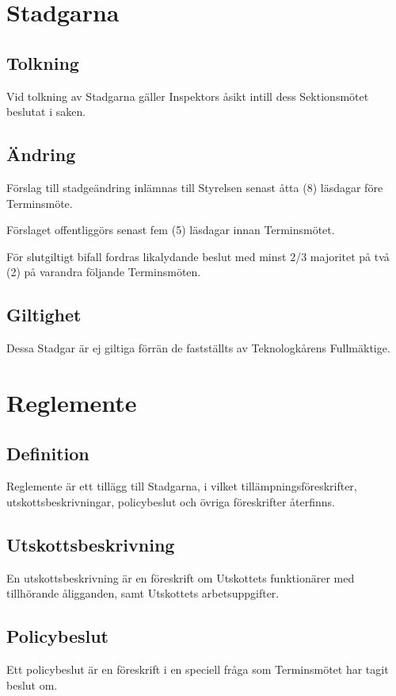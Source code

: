 \documentclass[10pt]{article}
\begin{document}
\section{Stadgarna}
\subsection{Tolkning}
Vid tolkning av Stadgarna gäller Inspektors åsikt intill dess Sektionsmötet
beslutat i saken.

\subsection{Ändring}
Förslag till stadgeändring inlämnas till Styrelsen senast åtta (8) läsdagar
före Terminsmöte.

Förslaget offentliggörs senast fem (5) läsdagar innan Terminsmötet.

För slutgiltigt bifall fordras likalydande beslut med minst 2/3 majoritet på
två (2) på varandra följande Terminsmöten.

\subsection{Giltighet}
Dessa Stadgar är ej giltiga förrän de fastställts av Teknologkårens
Fullmäktige.
\newpage

\section{Reglemente}
\subsection{Definition}
Reglemente är ett tillägg till Stadgarna, i vilket tillämpningsföreskrifter,
utskottsbeskrivningar, policybeslut och övriga föreskrifter återfinns.

\subsection{Utskottsbeskrivning}
En utskottsbeskrivning är en föreskrift om Utskottets funktionärer med
tillhörande åligganden, samt Utskottets arbetsuppgifter.

\subsection{Policybeslut}
Ett policybeslut är en föreskrift i en speciell fråga som Terminsmötet har
tagit beslut om.
\end{document}
